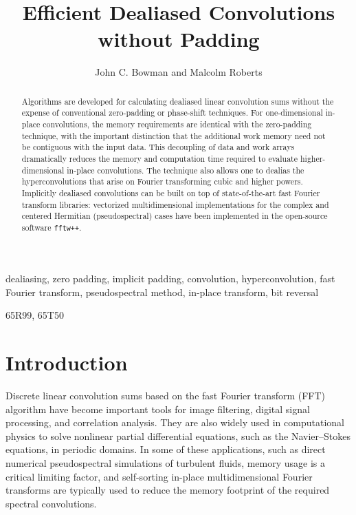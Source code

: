 \documentclass[final]{siamltex}
\begin{document}
\title{Efficient Dealiased Convolutions without Padding}
\author{John C. Bowman and Malcolm Roberts}
\maketitle

\begin{abstract}
Algorithms are developed for calculating dealiased linear convolution sums
without the expense of conventional zero-padding or phase-shift
techniques. For one-dimensional in-place convolutions, the memory
requirements are identical with the zero-padding technique, with the important
distinction that the additional work memory need not be contiguous with the
input data. This decoupling of data and work arrays dramatically reduces
the memory and computation time required to evaluate higher-dimensional
in-place convolutions. The technique also allows one to dealias the
hyperconvolutions that arise on Fourier transforming cubic and higher powers.
Implicitly dealiased convolutions can be built on top of state-of-the-art
fast Fourier transform libraries: vectorized multidimensional implementations
for the complex and centered Hermitian (pseudospectral) cases have
been implemented in the open-source software {\tt fftw++}.
\end{abstract} 

\begin{keywords} 
dealiasing, zero padding, implicit padding, convolution, hyperconvolution,
fast Fourier transform, pseudospectral method, in-place transform, bit reversal
\end{keywords}

\begin{AMS}
65R99, 65T50
\end{AMS}

\pagestyle{myheadings}



\section{Introduction}
Discrete linear convolution sums based on the fast Fourier transform
(FFT) algorithm \cite{Gauss1866,Cooley65} have become important tools
for image filtering, digital signal processing, and correlation
analysis. They are also widely used in computational physics to solve
nonlinear partial differential equations, such as the Navier--Stokes
equations, in periodic domains. In some of these applications, such as
direct numerical pseudospectral simulations of turbulent fluids,
memory usage is a critical limiting factor, and self-sorting in-place
multidimensional Fourier transforms \cite{Temperton91} are typically used to
reduce the memory footprint of the required spectral convolutions.
\end{document}
